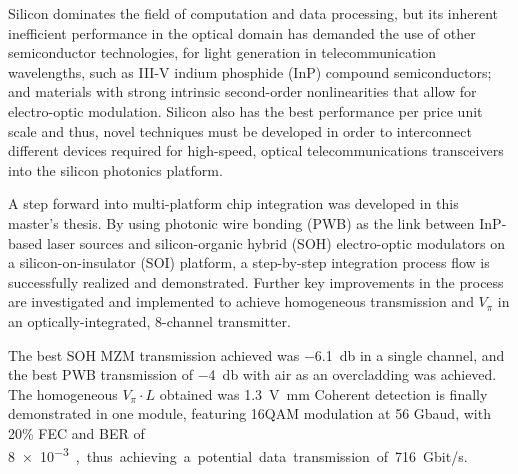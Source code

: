 %
\Abstract
Silicon dominates the field of computation and data processing, but its inherent inefficient performance in the optical domain has demanded the use of other semiconductor technologies, for light generation in telecommunication wavelengths, such as III-V indium phosphide (InP) compound semiconductors; and materials with strong intrinsic second-order nonlinearities that allow for electro-optic modulation. Silicon also has the best performance per price unit scale and thus, novel techniques must be developed in order to interconnect different devices required for high-speed, optical telecommunications transceivers into the silicon photonics platform. 

\par\medskip
A step forward into multi-platform chip integration was developed in this master's thesis. By using photonic wire bonding (PWB) as the link between InP-based laser sources and silicon-organic hybrid (SOH) electro-optic modulators on a silicon-on-insulator (SOI) platform, a step-by-step integration process flow is successfully realized and demonstrated. Further key improvements in the process are investigated and implemented to achieve homogeneous transmission and $V_\pi$ in an optically-integrated, 8-channel transmitter. 

\par\medskip
The best SOH MZM transmission achieved was \SI{-6.1}{\decibel} in a single channel, and the best PWB transmission of \SI{-4}{\decibel} with air as an overcladding was achieved. The homogeneous $V_\pi \cdot L$ obtained was \SI{1.3}{\volt\milli\meter}  Coherent detection is finally demonstrated in one module, featuring 16QAM modulation at 56 Gbaud, with 20\% FEC and BER of \SI{8e-3}, thus achieving a potential data transmission of 716 Gbit/s.
\par\medskip


%